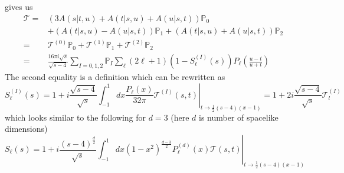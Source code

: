 ﻿\documentclass[12pt,a4paper]{article}
\begin{document}
gives us
$$
\begin{aligned}
\mathcal{T}=&(3 A(s|t, u)+A(t|s, u)+A(u|s, t)) \mathbb{P}_{0} \\
&+(A(t|s, u)-A(u|s, t)) \mathbb{P}_{1}+(A(t|s, u)+A(u|s, t)) \mathbb{P}_{2} \\
=& \mathcal{T}^{(0)} \mathbb{P}_{0}+ \mathcal{T}^{(1)} \mathbb{P}_{1}+ \mathcal{T}^{(2)} \mathbb{P}_{2} \\
=& \frac{16 \pi i \sqrt{s}}{\sqrt{s-4}} \sum_{I=0,1,2} \mathbb{P}_{I} \sum_{\ell}(2 \ell+1)\left(1-S_{\ell}^{(I)}(s)\right) P_{\ell}\left(\frac{u-t}{u+t}\right)
\end{aligned}
$$
The second equality is a definition which can be rewritten as 
$$
S_{\ell}^{(I)}(s)=1+\left.i \frac{\sqrt{s-4}}{\sqrt{s}} \int_{-1}^{1} d x \frac{P_{\ell}(x)}{32 \pi} \mathcal{T}^{(I)}(s, t)\right|_{t \rightarrow \frac{1}{2}(s-4)(x-1)}=1+2 i \frac{\sqrt{s-4}}{\sqrt{s}} \mathcal{T}_{l}^{(I)}
$$
which looks similar to the following for $d=3$ (here $d$ is number of spacelike dimensions)
$$
S_{\ell}(s)=1+\left.i \frac{(s-4)^{\frac{d}{2}}}{\sqrt{s}} \int_{-1}^{1} d x\left(1-x^{2}\right)^{\frac{d-3}{2}} P_{\ell}^{(d)}(x)\mathcal{T}(s, t)\right|_{t \rightarrow \frac{1}{2}(s-4)(x-1)}
$$
\end{document}
